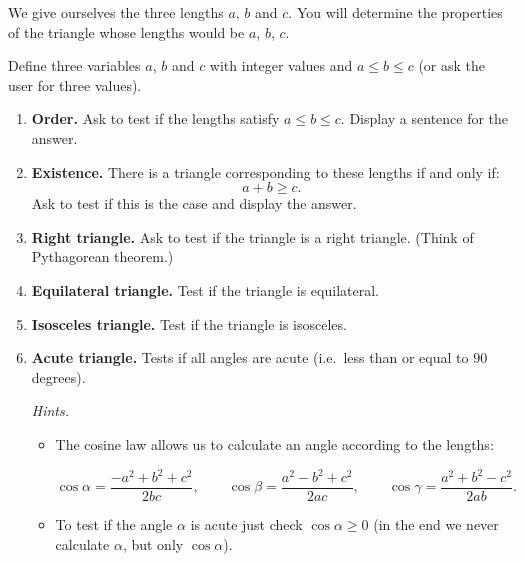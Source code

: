 \documentclass[11pt,class=report,crop=false]{standalone}
\begin{document}
\begin{activite}[Triangles]


We give ourselves the three lengths $a$, $b$ and $c$. You will determine the properties of the triangle whose lengths would be $a$, $b$, $c$.



Define three variables $a$, $b$ and $c$ with integer values and $a \le b \le c$ (or ask the user for three values).

\begin{enumerate}
  \item \textbf{Order.} Ask \Python{} to test if the lengths satisfy $a \le b \le c$. Display a sentence for the answer.
  
  \item \textbf{Existence.} There is a triangle corresponding to these lengths if and only if:
  $$a + b \ge c.$$
  Ask \Python{} to test if this is the case and display the answer.
  
  
  \item \textbf{Right triangle.} Ask \Python{} to test if the triangle is a right triangle. (Think of Pythagorean theorem.)
  
   \item \textbf{Equilateral triangle.} Test if the triangle is equilateral. 
   
   \item \textbf{Isosceles triangle.} Test if the triangle is isosceles.   
   
   \item \textbf{Acute triangle.} Tests if all angles are acute (i.e.~less than or equal to $90$ degrees).
   
    \emph{Hints.} 
    \begin{itemize}
      \item The cosine law allows us to calculate an angle according to the lengths:
      
   
   $$\cos \alpha = \frac{-a^2+b^2+c^2}{2bc},
   \qquad
   \cos \beta = \frac{a^2-b^2+c^2}{2ac},
   \qquad
   \cos \gamma = \frac{a^2+b^2-c^2}{2ab}.$$   

   \smallskip
   
    \item To test if the angle $\alpha$ is acute just check $\cos \alpha \ge 0$ (in the end we never calculate $\alpha$, but only $\cos \alpha$).
   
   \end{itemize} 
   
\end{enumerate}   
     
    \smallskip 
     
    
\end{activite}
\end{document}
